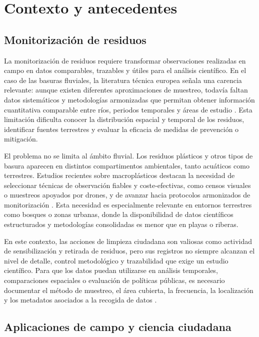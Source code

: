 \chapter{Contexto y antecedentes}

\section{Monitorización de residuos}

La monitorización de residuos requiere transformar observaciones realizadas en
campo en datos comparables, trazables y útiles para el análisis científico. En el
caso de las basuras fluviales, la literatura técnica europea señala una carencia
relevante: aunque existen diferentes aproximaciones de muestreo, todavía faltan
datos sistemáticos y metodologías armonizadas que permitan obtener información
cuantitativa comparable entre ríos, periodos temporales y áreas de estudio
\cite{gonzalez2016riverine}. Esta limitación dificulta conocer la distribución
espacial y temporal de los residuos, identificar fuentes terrestres y evaluar la
eficacia de medidas de prevención o mitigación.

El problema no se limita al ámbito fluvial. Los residuos plásticos y otros tipos
de basura aparecen en distintos compartimentos ambientales, tanto acuáticos como
terrestres. Estudios recientes sobre macroplásticos destacan la necesidad de
seleccionar técnicas de observación fiables y coste-efectivas, como censos
visuales o muestreos apoyados por drones, y de avanzar hacia protocolos
armonizados de monitorización \cite{gallitelli2024macroplastics}. Esta necesidad
es especialmente relevante en entornos terrestres como bosques o zonas urbanas,
donde la disponibilidad de datos científicos estructurados y metodologías
consolidadas es menor que en playas o riberas.

En este contexto, las acciones de limpieza ciudadana son valiosas como actividad
de sensibilización y retirada de residuos, pero sus registros no siempre alcanzan
el nivel de detalle, control metodológico y trazabilidad que exige un estudio
científico. Para que los datos puedan utilizarse en análisis temporales,
comparaciones espaciales o evaluación de políticas públicas, es necesario
documentar el método de muestreo, el área cubierta, la frecuencia, la localización
y los metadatos asociados a la recogida de datos \cite{gonzalez2016riverine}.

\section{Aplicaciones de campo y ciencia ciudadana}

